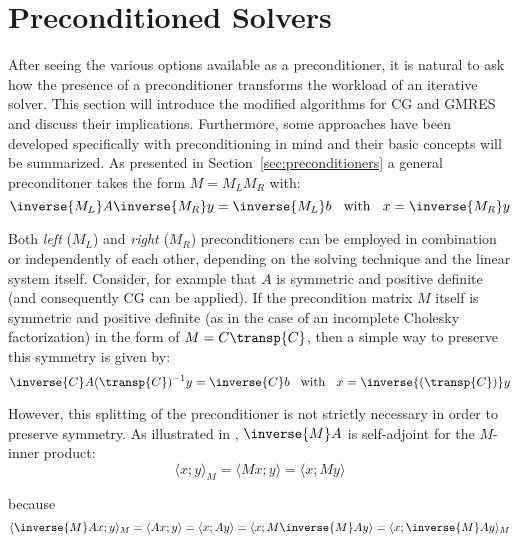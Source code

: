 \section{Preconditioned Solvers}
\label{sec:preconditioned_methods}

After seeing the various options available as a preconditioner, it is natural to ask how the presence of a preconditioner transforms the workload of an iterative solver. This section will introduce the modified algorithms for CG and GMRES and discuss their implications. Furthermore, some approaches have been developed specifically with preconditioning in mind and their basic concepts will be summarized. As presented in Section~\hyperref[sec:preconditioners]{\ref{sec:preconditioners}} a general preconditoner takes the form $M=M_LM_R$ with:
\begin{equation}
    \inverse{M_L}A\inverse{M_R}y = \inverse{M_L}b\;\; \text{ with }\;\; x=\inverse{M_R}y
\end{equation}

\noindent Both \textit{left} ($M_L$) and \textit{right} ($M_R$) preconditioners can be employed in combination or independently of each other, depending on the solving technique and the linear system itself. Consider, for example that $A$ is symmetric and positive definite (and consequently CG can be applied). If the precondition matrix $M$ itself is symmetric and positive definite (as in the case of an incomplete Cholesky factorization) in the form of $M=C\transp{C}$, then a simple way to preserve this symmetry is given by:
\begin{equation}
    \inverse{C}A(\transp{C})^{-1}y = \inverse{C}b\;\; \text{ with }\;\; x=\inverse{(\transp{C})}y
\end{equation}

\noindent However, this splitting of the preconditioner is not strictly necessary in order to preserve symmetry. As illustrated in \cite{saad_iterative_2003}, $\inverse{M}A$ is self-adjoint for the $M$-inner product:
\begin{equation}
    \langle x;y \rangle_M = \langle Mx;y \rangle = \langle x;My \rangle
\end{equation}

\noindent because
\begin{equation}
    \langle \inverse{M}Ax;y \rangle_M = \langle Ax;y \rangle = \langle x;Ay \rangle=\langle x;M\inverse{M}Ay \rangle = \langle x;\inverse{M}Ay \rangle_M
\end{equation}

